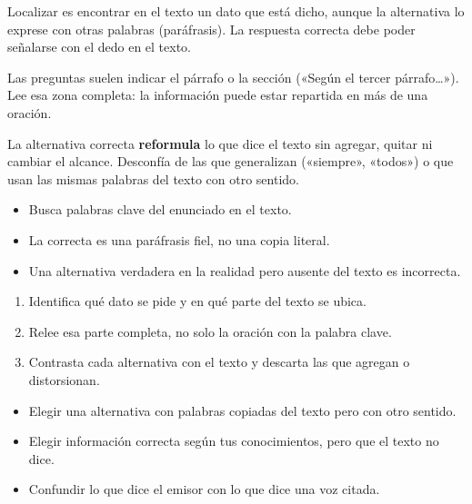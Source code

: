 \documentclass[10pt,a4paper,twocolumn]{article}
\begin{document}
Localizar es encontrar en el texto un dato que está dicho, aunque la alternativa lo exprese con otras palabras (paráfrasis). La respuesta correcta debe poder señalarse con el dedo en el texto.

Las preguntas suelen indicar el párrafo o la sección («Según el tercer párrafo\ldots{}»). Lee esa zona completa: la información puede estar repartida en más de una oración.

\begin{definicion}
La alternativa correcta \textbf{reformula} lo que dice el texto sin agregar, quitar ni cambiar el alcance. Desconfía de las que generalizan («siempre», «todos») o que usan las mismas palabras del texto con otro sentido.
\end{definicion}

\begin{ideasclave}
\begin{itemize}
  \item Busca palabras clave del enunciado en el texto.
  \item La correcta es una paráfrasis fiel, no una copia literal.
  \item Una alternativa verdadera en la realidad pero ausente del texto es incorrecta.
\end{itemize}
\end{ideasclave}

\begin{metodo}
\begin{enumerate}
  \item Identifica qué dato se pide y en qué parte del texto se ubica.
  \item Relee esa parte completa, no solo la oración con la palabra clave.
  \item Contrasta cada alternativa con el texto y descarta las que agregan o distorsionan.
\end{enumerate}
\end{metodo}

\begin{errorfrecuente}
\begin{itemize}
  \item Elegir una alternativa con palabras copiadas del texto pero con otro sentido.
  \item Elegir información correcta según tus conocimientos, pero que el texto no dice.
  \item Confundir lo que dice el emisor con lo que dice una voz citada.
\end{itemize}
\end{errorfrecuente}
\end{document}
